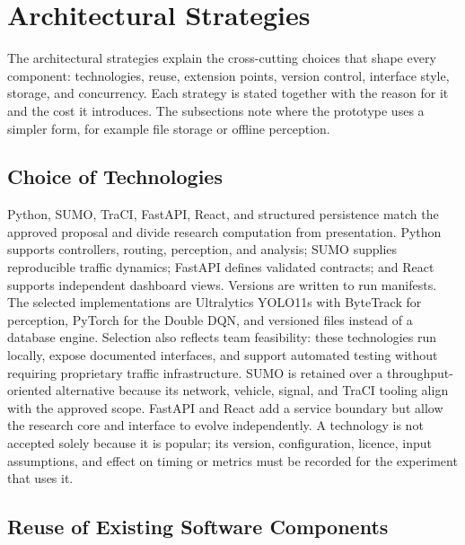 \section{Architectural Strategies}

The architectural strategies explain the cross-cutting choices that shape every component: technologies, reuse, extension points, version control, interface style, storage, and concurrency. Each strategy is stated together with the reason for it and the cost it introduces. The subsections note where the prototype uses a simpler form, for example file storage or offline perception.

\subsection{Choice of Technologies}

Python, SUMO, TraCI, FastAPI, React, and structured persistence match the approved proposal and divide research computation from presentation. Python supports controllers, routing, perception, and analysis; SUMO supplies reproducible traffic dynamics; FastAPI defines validated contracts; and React supports independent dashboard views. Versions are written to run manifests. The selected implementations are Ultralytics YOLO11s with ByteTrack for perception, PyTorch for the Double DQN, and versioned files instead of a database engine. Selection also reflects team feasibility: these technologies run locally, expose documented interfaces, and support automated testing without requiring proprietary traffic infrastructure. SUMO is retained over a throughput-oriented alternative because its network, vehicle, signal, and TraCI tooling align with the approved scope. FastAPI and React add a service boundary but allow the research core and interface to evolve independently. A technology is not accepted solely because it is popular; its version, configuration, licence, input assumptions, and effect on timing or metrics must be recorded for the experiment that uses it.

\subsection{Reuse of Existing Software Components}

